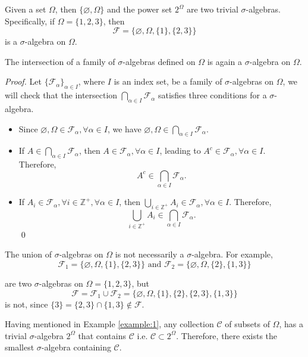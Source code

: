 \begin{example}
    \label{example:1}
    Given a set $\Omega$, then $\{\varnothing, \Omega\}$ and the power set $2^\Omega$ are two trivial $\sigma$-algebras. Specifically, if $\Omega=\{1,2,3\}$, then
    $$\mathcal{F}=\{\varnothing,\Omega, \{1\}, \{2,3\}\}$$
    is a $\sigma$-algebra on $\Omega$.
\end{example}

\begin{theorem}
    The intersection of a family of $\sigma$-algebras defined on $\Omega$ is again a $\sigma$-algebra on $\Omega$.
\end{theorem}

\textit{Proof.} Let $\{\mathcal{F}_\alpha\}_{\alpha\in I}$, where $I$ is an index set, be a family of $\sigma$-algebras on $\Omega$, we will check that the intersection $\bigcap\limits_{\alpha\in I}\mathcal{F}_\alpha$ satisfies three conditions for a $\sigma$-algebra.
\begin{itemize}
    \item Since $\varnothing,\Omega\in\mathcal{F}_\alpha,\forall\alpha\in I$, we have $\varnothing,\Omega\in\bigcap\limits_{\alpha\in I}\mathcal{F}_\alpha$.
    \item If $A\in\bigcap\limits_{\alpha\in I}\mathcal{F}_\alpha$, then $A\in \mathcal{F}_\alpha,\forall\alpha\in I$, leading to $A^c\in \mathcal{F}_\alpha,\forall\alpha\in I$. Therefore,
          $$A^c\in\bigcap\limits_{\alpha\in I}\mathcal{F}_\alpha.$$
    \item If $A_i\in\mathcal{F}_\alpha,\forall i\in\mathbb{Z}^+,\forall \alpha\in I$, then $\bigcup\limits_{i\in\mathbb{Z}^+}A_i\in\mathcal{F}_\alpha,\forall\alpha\in I$. Therefore,
          $$\bigcup\limits_{i\in\mathbb{Z}^+}A_i\in\bigcap\limits_{\alpha\in I}\mathcal{F}_\alpha.$$ \qed
\end{itemize}

\begin{remark}
    The union of $\sigma$-algebras on $\Omega$ is not necessarily a $\sigma$-algebra. For example,
    $$\mathcal{F}_1=\{\varnothing,\Omega, \{1\}, \{2,3\}\} \text{ and } \mathcal{F}_2=\{\varnothing,\Omega, \{2\}, \{1,3\}\}$$

    are two $\sigma$-algebras on $\Omega=\{1,2,3\}$, but
    $$\mathcal{F}=\mathcal{F}_1\cup\mathcal{F}_2=\{\varnothing,\Omega,\{1\},\{2\},\{2,3\},\{1,3\}\}$$ is not, since $\{3\}=\{2,3\}\cap\{1,3\}\notin \mathcal{F}$.
\end{remark}

Having mentioned in Example \ref{example:1}, any collection $\mathcal{C}$ of subsets of $\Omega$, has a trivial $\sigma$-algebra $2^\Omega$ that contains $\mathcal{C}$ i.e. $\mathcal{C}\subset2^\Omega$. Therefore, there exists the smallest $\sigma$-algebra containing $\mathcal{C}$.

